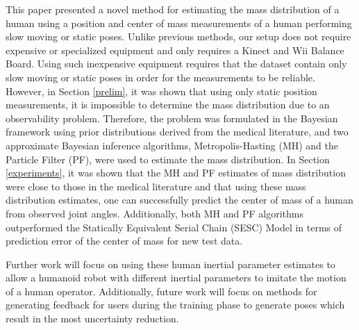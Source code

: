 This paper presented a novel method for estimating the mass distribution of a human using a position and center of mass measurements of a human performing slow moving or static poses. 
Unlike previous methods, our setup does not require expensive or specialized equipment and only requires a Kinect and Wii Balance Board.
Using such inexpensive equipment requires that the dataset contain only slow moving or static poses in order for the measurements to be reliable. 
However, in Section \ref{prelim}, it was shown that using only static position measurements, it is impossible to determine the mass distribution due to an observability problem. 
Therefore, the problem was formulated in the Bayesian framework using prior distributions derived from the medical literature, and two approximate Bayesian inference algorithms, Metropolis-Hasting (MH) and the Particle Filter (PF), were used to estimate the mass distribution. 
In Section \ref{experiments}, it was shown that the MH and PF estimates of mass distribution were close to those in the medical literature and that using these mass distribution estimates, one can successfully predict the center of mass of a human from observed joint angles. 
Additionally, both MH and PF algorithms outperformed the Statically Equivalent Serial Chain (SESC) Model \cite{gonzalez2012estimation} in terms of prediction error of the center of mass for new test data.

Further work will focus on using these human inertial parameter estimates to allow a humanoid robot with different inertial parameters to imitate the motion of a human operator. 
Additionally, future work will focus on methods for generating feedback for users during the training phase to generate poses which result in the most uncertainty reduction.


